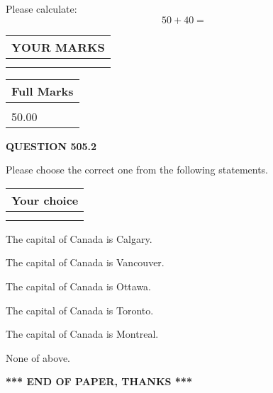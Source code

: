 \documentclass[12pt]{article}
\begin{document}
  
 
Please calculate:
\begin{equation}
50 +  %
40 = \nonumber
\end{equation}
 

 

 
  
\vspace{0.2in}
  
\noindent\begin{tabular}{|l|}
\hline
 YOUR MARKS  \\
\hline
 \\ 
 \\ 
\hline
\end{tabular}
\hspace{0.05in} \begin{tabular}{|l|}
\hline
 Full Marks  \\
\hline
 \\ 
50.00 \\
\hline
\end{tabular}
{\textbf{\Large{QUESTION
505.2 
}}}
  
  
Please choose the correct one from the following statements.
  
  
\noindent\hspace{3.0in} \begin{tabular}{|l|}
\hline
Your choice \\
\hline
 \\ 
 \\ 
\hline
\end{tabular}
  
  
 
 
The capital of Canada is Calgary.
 
 
The capital of Canada is Vancouver.
 
 
The capital of Canada is Ottawa.
 
 
The capital of Canada is Toronto.
 
 
The capital of Canada is Montreal.
 
 
 None of above.
 
 
   
   
 \vspace{0.2in}
 
   
   
   
   
\vspace{1.0in} 
{\textbf{\large{ *** END OF PAPER, THANKS *** }}} 
   
\end{document}
